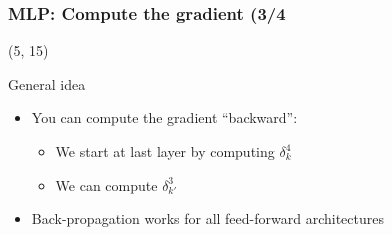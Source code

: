 \begin{frame}
  \frametitle{\acl{MLP}: Compute the gradient (3/4}

  \begin{textblock}{90}(5, 15)
    \begin{block}{General idea}
      \begin{itemize}
      \item You can compute the gradient ``backward'':
        \begin{itemize}
        \item We start at last layer by computing $\delta_k^4$
        \item We can compute $\delta_{k'}^3$
        \end{itemize}
      \item<2-> Back-propagation works for all feed-forward architectures
        \hyperlink{MLP_Learning_2}{}
      \end{itemize}
    \end{block}
  \end{textblock}
\end{frame}
